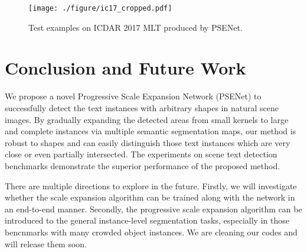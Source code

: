 \documentclass{article}
\begin{document}
\begin{figure}[t]
\begin{center}
		{\texttt{[image: ./figure/ic17\_cropped.pdf]}}
		\vspace{-10pt}
		\caption{Test examples on ICDAR 2017 MLT produced by PSENet.}
		\label{fig_ic17_cropped}
	\end{center}
\end{figure}

\section{Conclusion and Future Work}
We propose a novel Progressive Scale Expansion Network (PSENet) to successfully detect the text instances with arbitrary shapes in natural scene images. By gradually expanding the detected areas from small kernels to large and complete instances via multiple semantic segmentation maps, our method is robust to shapes and can easily distinguish those text instances which are very close or even partially intersected. The experiments on scene text detection benchmarks demonstrate the superior performance of the proposed method. 

There are multiple directions to explore in the future. Firstly, we will investigate whether the scale expansion algorithm can be trained along with the network in an end-to-end manner. Secondly, the progressive scale expansion algorithm can be introduced to the general instance-level segmentation tasks, especially in those bencnmarks with many crowded object instances. We are cleaning our codes and will release them soon.



\end{document}
